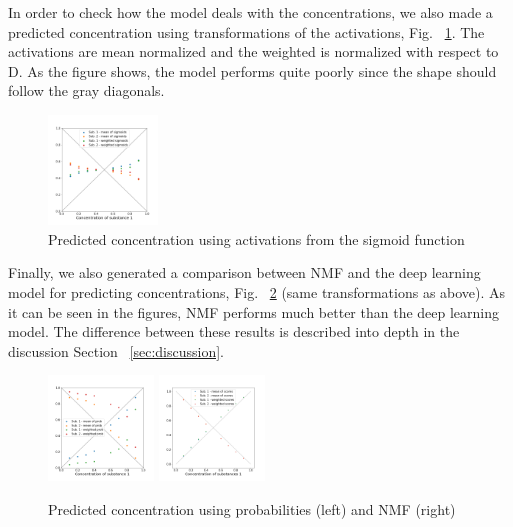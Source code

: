 \documentclass{article}
\begin{document}
%
In order to check how the model deals with the concentrations, we also made a predicted concentration using transformations of the activations, Fig. ~\ref{fig:conc_sigmoids}. The activations are mean normalized and the weighted is normalized with respect to D. 
As the figure shows, the model performs quite poorly since the shape should follow the gray diagonals. 
\begin{figure}[H]
	\centering
	\includegraphics[width=0.26\textwidth]{DNN_pred_conc_sigmoid_2.png} 
	\caption{Predicted concentration using activations from the sigmoid function}
	\label{fig:conc_sigmoids}
\end{figure}
%
Finally, we also generated a comparison between NMF and the deep learning model for predicting concentrations, Fig. ~\ref{fig:comparison} (same transformations as above). As it can be seen in the figures, NMF performs much better than the deep learning model. The difference between these results is described into depth in the discussion Section ~\ref{sec:discussion}.
\begin{figure}[H]
	\includegraphics[width=0.25\textwidth]{DNN_pred_conc_prob_2.png} \hspace*{-.5cm}
	\includegraphics[width=0.25\textwidth]{nmf_pred_conc_2.png}
	\caption{Predicted concentration using probabilities (left) and NMF (right)}
	\label{fig:comparison}
\end{figure}
\end{document}
